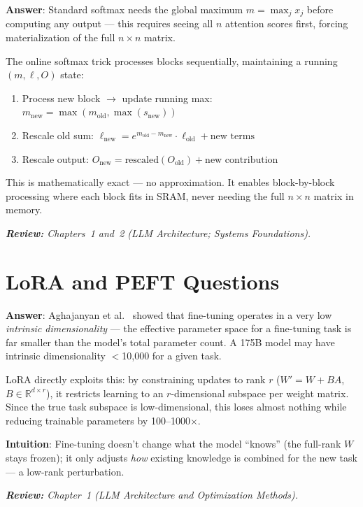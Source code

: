 \begin{questionbox}
\textbf{Answer}: Standard softmax needs the global maximum $m = \max_j x_j$ before computing any output --- this requires seeing all $n$ attention scores first, forcing materialization of the full $n \times n$ matrix.

The online softmax trick processes blocks sequentially, maintaining a running $(m, \ell, O)$ state:

\begin{enumerate}
  \item Process new block $\to$ update running max: $m_{\text{new}} = \max(m_{\text{old}}, \max(s_{\text{new}}))$
  \item Rescale old sum: $\ell_{\text{new}} = e^{m_{\text{old}} - m_{\text{new}}} \cdot \ell_{\text{old}} + \text{new terms}$
  \item Rescale output: $O_{\text{new}} = \text{rescaled}(O_{\text{old}}) + \text{new contribution}$
\end{enumerate}

This is mathematically exact --- no approximation. It enables block-by-block processing where each block fits in SRAM, never needing the full $n \times n$ matrix in memory.

\emph{\textbf{Review:} Chapters~1 and~2 (LLM Architecture; Systems Foundations).}
\end{questionbox}

\section{LoRA and PEFT Questions}
\label{lora-and-peft-questions}

\begin{questionbox}
\textbf{Answer}: Aghajanyan et al.~\cite{aghajanyan2020intrinsic} showed that fine-tuning operates in a very low \emph{intrinsic dimensionality} --- the effective parameter space for a fine-tuning task is far smaller than the model’s total parameter count. A 175B model may have intrinsic dimensionality $<$10,000 for a given task.

LoRA directly exploits this: by constraining updates to rank $r$ ($W' = W + BA$, $B \in \mathbb{R}^{d \times r}$), it restricts learning to an $r$-dimensional subspace per weight matrix. Since the true task subspace is low-dimensional, this loses almost nothing while reducing trainable parameters by 100--1000$\times$.

\textbf{Intuition}: Fine-tuning doesn’t change what the model ``knows'' (the full-rank $W$ stays frozen); it only adjusts \emph{how} existing knowledge is combined for the new task --- a low-rank perturbation.

\emph{\textbf{Review:} Chapter~1 (LLM Architecture and Optimization Methods).}
\end{questionbox}

